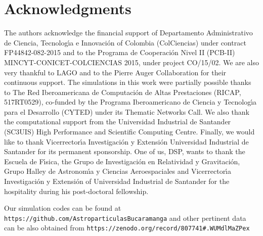 \documentclass[letterpaper,10pt,titlepage,linenumber]{article}
\begin{document}
\section*{Acknowledgments}
The authors acknowledge the financial support of  Departamento Administrativo de Ciencia, Tecnolog\'{\i}a e Innovaci\'on of Colombia (ColCiencias) under contract FP44842-082-2015 and to the Programa de Cooperaci\'on Nivel II (PCB-II) MINCYT-CONICET-COLCIENCIAS 2015, under project CO/15/02.  We are also very thankful to LAGO and to the Pierre Auger Collaboration for their continuous support.  The simulations in this work were partially possible thanks to The Red Iberoamericana de Computaci\'on de Altas Prestaciones (RICAP, 517RT0529), co-funded by the Programa Iberoamericano de Ciencia y Tecnolog\'{\i}a para el Desarrollo (CYTED) under its Thematic Networks Call. We also thank the computational support from the Universidad Industrial de Santander (SC3UIS) High Performance and Scientific Computing Centre. Finally, we would like to thank Vicerrector\'{\i}a Investigaci\'on y Extensi\'on Universidad Industrial de Santander for its permanent sponsorship. One of us, DSP, wants to thank the Escuela de F\'{\i}sica, the Grupo de Investigaci\'on en Relatividad y Gravitaci\'on, Grupo Halley de Astronom\'{\i}a y Ciencias Aeroespaciales and Vicerrector\'{\i}a Investigaci\'on y Extensi\'on of Universidad Industrial de Santander for the hospitality during his post-doctoral fellowship.

Our simulation codes can be found at \texttt{https://github.com/AstroparticulasBucaramanga} and other pertinent data can be also obtained from \texttt{https://zenodo.org/record/807741\#.WUMdlMaZPex }


%

\end{document}
